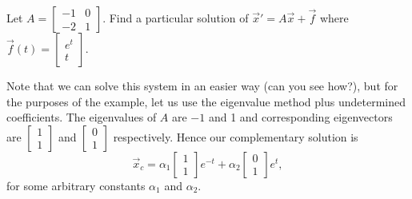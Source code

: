 \begin{example}
Let $A = \left[
\begin{smallmatrix}
-1 & 0 \\
-2 & 1
\end{smallmatrix} \right]$.
Find a particular solution of ${\vec{x}}' = A \vec{x} +
\vec{f}$ where $\vec{f}(t) = 
\left[ \begin{smallmatrix}
e^t \\
t
\end{smallmatrix} \right]$.

Note that we can solve this system in an easier way (can you see how?), but
for the purposes of the example, let us use the eigenvalue method plus
undetermined coefficients.
The eigenvalues of $A$ are 
$-1$ and 1 and corresponding eigenvectors
are
$\left[ \begin{smallmatrix}
1 \\
1
\end{smallmatrix} \right]$ and
$\left[ \begin{smallmatrix}
0 \\
1
\end{smallmatrix} \right]$ respectively.
Hence our complementary solution is
\begin{equation*}
\vec{x}_c = 
\alpha_1
\begin{bmatrix}
1 \\ 1
\end{bmatrix}
e^{-t}
+
\alpha_2
\begin{bmatrix}
0 \\ 1
\end{bmatrix}
e^{t} ,
\end{equation*}
for some arbitrary constants $\alpha_1$ and $\alpha_2$.


\end{example}
